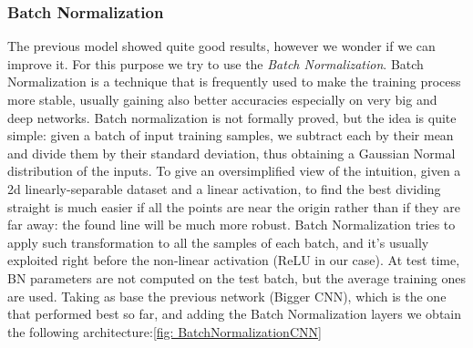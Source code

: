 \subsubsection{Batch Normalization}
The previous model showed quite good results, however we wonder if we can improve it. For this purpose we try to use the \textit{Batch Normalization}.
Batch Normalization is a technique that is frequently used to make the training process more stable, usually gaining also better accuracies especially on very big and deep networks. Batch normalization is not formally proved, but the idea is quite simple: given a batch of input training samples, we subtract each by their mean and divide them by their standard deviation, thus obtaining a Gaussian Normal distribution of the inputs. To give an oversimplified view of the intuition, given a 2d linearly-separable dataset and a linear activation, to find the best dividing straight is much easier if all the points are near the origin rather than if they are far away: the found line will be much more robust. Batch Normalization tries to apply such transformation to all the samples of each batch, and it's usually exploited right before the non-linear activation (ReLU in our case). At test time, BN parameters are not computed on the test batch, but the average training ones are used. Taking as base the previous network (Bigger CNN), which is the one that performed best so far, and adding the Batch Normalization layers we obtain the following architecture:\ref{fig: BatchNormalizationCNN}

